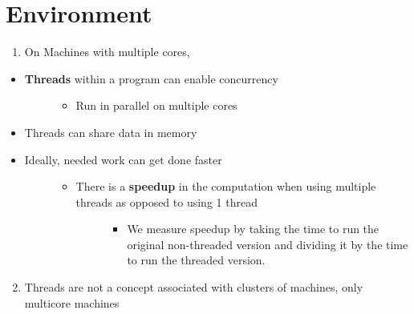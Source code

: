 \documentclass[letterpaper,10pt,openany,oneside]{sphinxmanual}
\begin{document}
\section{Environment}
\label{URLSpider/URLSpider:environment}\begin{enumerate}
\item {} 
On Machines with multiple cores,

\end{enumerate}
\begin{itemize}
\item {} \begin{description}
\item[{\textbf{Threads} within a program can enable concurrency}] \leavevmode\begin{itemize}
\item {} 
Run in parallel on multiple cores

\end{itemize}

\end{description}

\item {} 
Threads can share data in memory

\item {} \begin{description}
\item[{Ideally, needed work can get done faster}] \leavevmode\begin{itemize}
\item {} \begin{description}
\item[{There is a \textbf{speedup} in the computation when using multiple threads as opposed to using 1 thread}] \leavevmode\begin{itemize}
\item {} 
We measure speedup by taking the time to run the original non-threaded version and dividing it by the time to run the threaded version.

\end{itemize}

\end{description}

\end{itemize}

\end{description}

\end{itemize}
\begin{enumerate}
\setcounter{enumi}{1}
\item {} 
Threads are not a concept associated with clusters of machines, only multicore machines

\end{enumerate}
\end{document}
